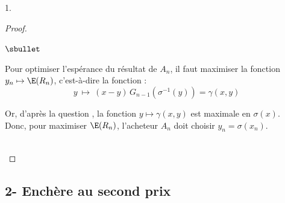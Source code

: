 \documentclass[11pt]{article}%
\begin{document}
\begin{noliste}{1.}
  \begin{proof}~
    \begin{noliste}{$\sbullet$}
      \item Pour optimiser l'espérance du résultat de $A_n$, il faut
      maximiser la fonction $y_n \mapsto \E(R_n)$, c'est-à-dire la 
      fonction :
      \[
        y \ \mapsto \ (x-y) \, G_{n-1}(\sigma^{-1}(y)) = \gamma(x,y)
      \]
      
      \item Or, d'après la question , la fonction 
      $y \mapsto \gamma(x,y)$ est maximale en $\sigma(x)$.\\
      Donc, pour maximiser $\E(R_n)$, l'acheteur $A_n$ doit choisir
      $y_n=\sigma(x_n)$.
    \end{noliste}
    
    ~\\[-1.2cm]
  \end{proof}
\end{noliste}



\newpage



\subsection*{2- Enchère au second prix}
\end{document}
